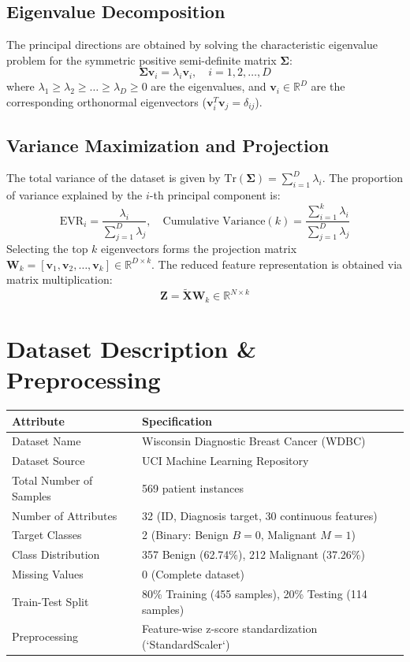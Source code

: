 \documentclass[12pt,a4paper]{article}
\begin{document}
\subsection{Eigenvalue Decomposition}
The principal directions are obtained by solving the characteristic eigenvalue problem for the symmetric positive semi-definite matrix $\mathbf{\Sigma}$:
\begin{equation}
\mathbf{\Sigma} \mathbf{v}_i = \lambda_i \mathbf{v}_i, \quad i = 1, 2, \dots, D
\end{equation}
where $\lambda_1 \ge \lambda_2 \ge \dots \ge \lambda_D \ge 0$ are the eigenvalues, and $\mathbf{v}_i \in \mathbb{R}^D$ are the corresponding orthonormal eigenvectors ($\mathbf{v}_i^T \mathbf{v}_j = \delta_{ij}$).

\subsection{Variance Maximization and Projection}
The total variance of the dataset is given by $\text{Tr}(\mathbf{\Sigma}) = \sum_{i=1}^D \lambda_i$. The proportion of variance explained by the $i$-th principal component is:
\begin{equation}
\text{EVR}_i = \frac{\lambda_i}{\sum_{j=1}^D \lambda_j}, \quad \text{Cumulative Variance}(k) = \frac{\sum_{i=1}^k \lambda_i}{\sum_{j=1}^D \lambda_j}
\end{equation}
Selecting the top $k$ eigenvectors forms the projection matrix $\mathbf{W}_k = [\mathbf{v}_1, \mathbf{v}_2, \dots, \mathbf{v}_k] \in \mathbb{R}^{D \times k}$. The reduced feature representation is obtained via matrix multiplication:
\begin{equation}
\mathbf{Z} = \mathbf{\tilde{X}} \mathbf{W}_k \in \mathbb{R}^{N \times k}
\end{equation}

\section{Dataset Description \& Preprocessing}
\begin{longtable}{|p{5.5cm}|p{8.5cm}|}
\hline
\textbf{Attribute} & \textbf{Specification} \\ \hline
\endhead
Dataset Name & Wisconsin Diagnostic Breast Cancer (WDBC) \\ \hline
Dataset Source & UCI Machine Learning Repository \\ \hline
Total Number of Samples & 569 patient instances \\ \hline
Number of Attributes & 32 (ID, Diagnosis target, 30 continuous features) \\ \hline
Target Classes & 2 (Binary: Benign $B=0$, Malignant $M=1$) \\ \hline
Class Distribution & 357 Benign (62.74\%), 212 Malignant (37.26\%) \\ \hline
Missing Values & 0 (Complete dataset) \\ \hline
Train-Test Split & 80\% Training (455 samples), 20\% Testing (114 samples) \\ \hline
Preprocessing & Feature-wise z-score standardization (`StandardScaler`) \\ \hline
\end{longtable}
\end{document}
